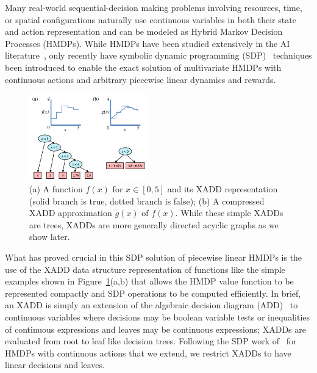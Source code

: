 Many real-world sequential-decision making problems involving
resources, time, or spatial configurations naturally use continuous
variables in both their state and action representation and can be
modeled as Hybrid Markov Decision Processes (HMDPs).  While HMDPs have
been studied extensively in the AI
literature~\cite{boyan01,feng04,li05,kveton06,phase07,hao09}, only
recently have symbolic dynamic programming
(SDP)~\cite{sanner_uai11,zamani12} techniques been introduced to
enable the exact solution of multivariate HMDPs with continuous
actions and arbitrary piecewise linear dynamics and rewards.



\begin{figure}[!ht]
\vspace{-2mm}
\centering
\hspace{-5mm}\includegraphics[width=0.45\textwidth]{Figures/xadds/intro_diagram.pdf}
\caption{\footnotesize
(a) A function $f(x)$ for $x \in [0,5]$ and its XADD representation
(solid branch is true, dotted branch is false); (b) A compressed XADD
approximation $g(x)$ of $f(x)$.  While these simple XADDs are trees, XADDs 
are more generally directed acyclic graphs as we show 
later.}  \label{fig:stepfunfig}
\vspace{-3mm}
\end{figure}

What has proved crucial in this SDP solution of piecewise linear HMDPs
is the use of the XADD data structure representation of functions like
the simple examples shown in Figure~\ref{fig:stepfunfig}(a,b) that
allows the HMDP value function to be represented compactly and SDP
operations to be computed efficiently.  In brief, an XADD is simply an
extension of the algebraic decision diagram (ADD)~\cite{bahar93add} to
continuous variables where decisions may be boolean variable tests or
inequalities of continuous expressions and leaves may be continuous
expressions; XADDs are evaluated from root to leaf like decision
trees.  Following the SDP work of~\cite{zamani12} for HMDPs with
continuous actions that we extend, we restrict XADDs to have linear
decisions and leaves.

